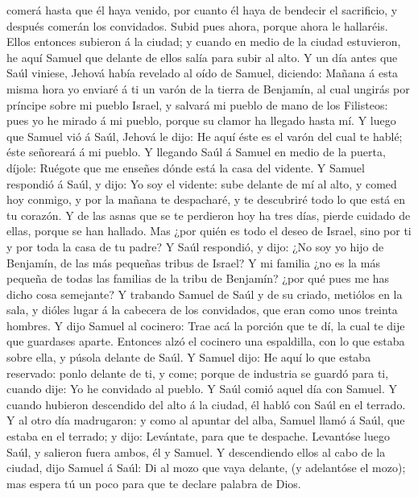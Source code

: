 comerá hasta que él haya venido, por cuanto él haya de bendecir el
sacrificio, y después comerán los convidados. Subid pues ahora, porque
ahora le hallaréis.  Ellos entonces subieron á la ciudad; y
cuando en medio de la ciudad estuvieron, he aquí Samuel que delante de
ellos salía para subir al alto.  Y un día antes que Saúl
viniese, Jehová había revelado al oído de Samuel, diciendo:
 Mañana á esta misma hora yo enviaré á ti un varón de la
tierra de Benjamín, al cual ungirás por príncipe sobre mi pueblo Israel,
y salvará mi pueblo de mano de los Filisteos: pues yo he mirado á mi
pueblo, porque su clamor ha llegado hasta mí.  Y luego que
Samuel vió á Saúl, Jehová le dijo: He aquí éste es el varón del cual te
hablé; éste señoreará á mi pueblo.  Y llegando Saúl á
Samuel en medio de la puerta, díjole: Ruégote que me enseñes dónde está
la casa del vidente.  Y Samuel respondió á Saúl, y dijo: Yo
soy el vidente: sube delante de mí al alto, y comed hoy conmigo, y por
la mañana te despacharé, y te descubriré todo lo que está en tu corazón.
 Y de las asnas que se te perdieron hoy ha tres días,
pierde cuidado de ellas, porque se han hallado. Mas ¿por quién es todo
el deseo de Israel, sino por ti y por toda la casa de tu padre?
 Y Saúl respondió, y dijo: ¿No soy yo hijo de Benjamín, de
las más pequeñas tribus de Israel? Y mi familia ¿no es la más pequeña de
todas las familias de la tribu de Benjamín? ¿por qué pues me has dicho
cosa semejante?  Y trabando Samuel de Saúl y de su criado,
metiólos en la sala, y dióles lugar á la cabecera de los convidados, que
eran como unos treinta hombres.  Y dijo Samuel al cocinero:
Trae acá la porción que te dí, la cual te dije que guardases aparte.
 Entonces alzó el cocinero una espaldilla, con lo que
estaba sobre ella, y púsola delante de Saúl. Y Samuel dijo: He aquí lo
que estaba reservado: ponlo delante de ti, y come; porque de industria
se guardó para ti, cuando dije: Yo he convidado al pueblo. Y Saúl comió
aquel día con Samuel.  Y cuando hubieron descendido del
alto á la ciudad, él habló con Saúl en el terrado.  Y al
otro día madrugaron: y como al apuntar del alba, Samuel llamó á Saúl,
que estaba en el terrado; y dijo: Levántate, para que te despache.
Levantóse luego Saúl, y salieron fuera ambos, él y Samuel. 
Y descendiendo ellos al cabo de la ciudad, dijo Samuel á Saúl: Di al
mozo que vaya delante, (y adelantóse el mozo); mas espera tú un poco
para que te declare palabra de Dios.


